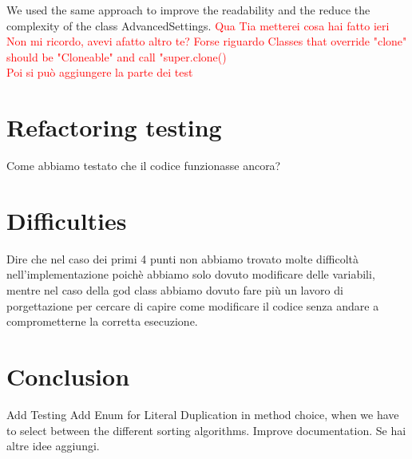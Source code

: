 \documentclass{article}
\begin{document}
We used the same approach to improve the readability and the reduce the complexity of the class AdvancedSettings.
\textcolor{red}{Qua Tia metterei cosa hai fatto ieri}\\

\textcolor{red}{Non mi ricordo, avevi afatto altro te? Forse riguardo Classes that override "clone" should be "Cloneable" and call "super.clone()}\\
\textcolor{red}{Poi si può aggiungere la parte dei test}\\
\section{Refactoring testing} 
Come abbiamo testato che il codice funzionasse ancora?
\section{Difficulties}
Dire che nel caso dei primi 4 punti non abbiamo trovato molte difficoltà nell'implementazione poichè abbiamo solo dovuto modificare delle variabili, mentre nel caso della god class abbiamo dovuto fare più un lavoro di porgettazione per cercare di capire come modificare il codice senza andare a comprometterne la corretta esecuzione.

\section{Conclusion}
Add Testing
Add Enum for Literal Duplication in method choice, when we have to select between the different sorting algorithms.
Improve documentation.
Se hai altre idee aggiungi.
\end{document}
